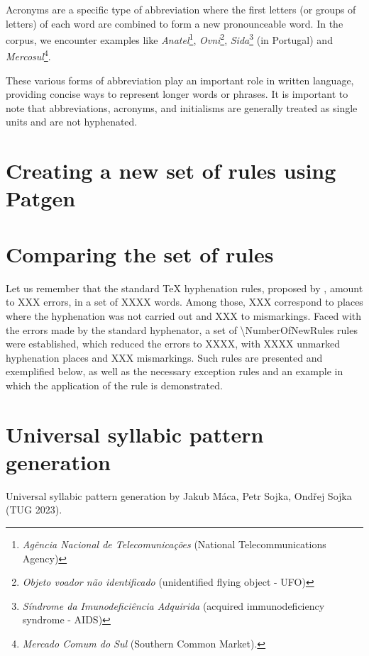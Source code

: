 \documentclass{article}
\begin{document}
\begin{description}
       Acronyms are a specific type of abbreviation where the first letters (or
       groups of letters) of each word are combined to form a new pronounceable
       word. In the corpus, we encounter examples like 
       \emph{Anatel}\footnote{\emph{Agência Nacional de Telecomunicações} (National Telecommunications Agency)},
       \emph{Ovni}\footnote{\emph{Objeto voador não identificado} (unidentified flying object - UFO)},
       \emph{Sida}\footnote{\emph{Síndrome da Imunodeficiência Adquirida} (acquired immunodeficiency syndrome - AIDS)} (in Portugal) and
       \emph{Mercosul}\footnote{\emph{Mercado Comum do Sul} (Southern Common Market).}.

       These various forms of abbreviation play an important role in written
       language, providing concise ways to represent longer words or phrases.
       It is important to note that abbreviations, acronyms, and initialisms
       are generally treated as single units and are not hyphenated.

\end{description}


\section{Creating a new set of rules using Patgen}



\section{Comparing the set of rules} 
Let us remember that the standard \TeX{} hyphenation rules, proposed by
\textcite{hyphpt}, amount to XXX errors, in a set of XXXX words.  Among those, XXX
correspond to places where the hyphenation was not carried out and XXX to
mismarkings. Faced with the errors made by the standard hyphenator, a set of
\num{\NumberOfNewRules} rules were established, which reduced the errors to XXXX,
with XXXX unmarked hyphenation places and XXX mismarkings.  Such rules are
presented and exemplified below, as well as the necessary exception rules and
an example in which the application of the rule is demonstrated.


\section{Universal syllabic pattern generation}
Universal syllabic pattern generation by Jakub Máca, Petr Sojka, Ondřej Sojka (TUG 2023).
\end{document}
